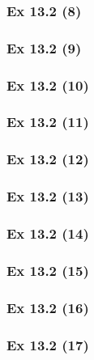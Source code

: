 \subsubsection{Ex 13.2 (8)}\label{sec:Ex_13.2.8}

\subsubsection{Ex 13.2 (9)}\label{sec:Ex_13.2.9}

\subsubsection{Ex 13.2 (10)}\label{sec:Ex_13.2.10}

\newpage		%

\subsubsection{Ex 13.2 (11)}\label{sec:Ex_13.2.11}

\subsubsection{Ex 13.2 (12)}\label{sec:Ex_13.2.12}

\subsubsection{Ex 13.2 (13)}\label{sec:Ex_13.2.13}

\subsubsection{Ex 13.2 (14)}\label{sec:Ex_13.2.14}

\subsubsection{Ex 13.2 (15)}\label{sec:Ex_13.2.15}

\subsubsection{Ex 13.2 (16)}\label{sec:Ex_13.2.16}

\subsubsection{Ex 13.2 (17)}\label{sec:Ex_13.2.17}

